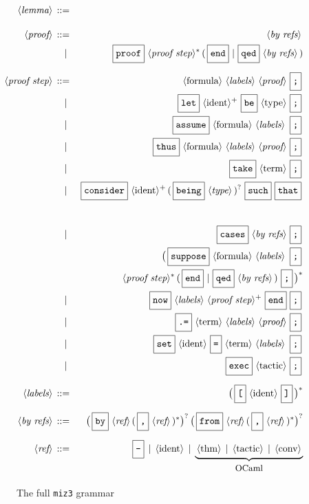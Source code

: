 \documentclass{LMCS}
\def\xtoolong{\hspace{-100cm}}
\def\notion#1{\,\langle\mbox{\it #1}\rangle\,}
\def\terminal#1{\,\langle\mbox{\rm #1}\rangle\,}
\def\key#1{\,\fbox{\strut\tt #1}\,}
\def\literal#1{\,\fbox{\strut\tt #1}\,}
\def\alter{\phantom{::=}\llap{$|$}}
\begin{document}
\begin{figure}
\vspace{2em}
\begin{eqnarray*}
\xtoolong\notion{lemma} &::=& \overbrace{\big(\key{let}\terminal{ident}\literal{=}\big)\!\strut^?\,\key{thm}\literal{`;}
\overbrace{\terminal{formula}\notion{proof}\literal{;}^?}^{\mbox{\small \texttt{miz3\vrule height 8.5pt depth 2pt width 0pt}}}
\literal{`}\literal{;;}}^{\mbox{\small HOL Light}}\xtoolong \\
\noalign{\medskip}
\notion{proof} &::=& \notion{by refs} \\
&\alter&
\key{proof}\notion{proof step}\!^*\,(\key{end}\,|\,\key{qed}\notion{by refs}) \\
\noalign{\medskip}
\xtoolong\notion{proof step} &::=& \terminal{formula}\notion{labels}\notion{proof}\literal{;} \\
&\alter& \key{let}\terminal{ident}\!^+\,\key{be}\terminal{type}\literal{;} \\
&\alter& \key{assume}\terminal{formula}\notion{labels}\,\literal{;} \\
&\alter& \key{thus}\terminal{formula}\notion{labels}\notion{proof}\literal{;} \\
&\alter& \key{take}\terminal{term}\literal{;} \\
&\alter& \key{consider}\terminal{ident}\!^+\,(\key{being}\notion{type})^?\,\key{such}\key{that} \\
&& \quad \terminal{formula}\notion{labels}
\notion{proof}\literal{;}\xtoolong \\
&\alter& \key{cases}\notion{by refs}\literal{;} \\
&& \big(\key{suppose}\terminal{formula}\notion{labels}\,\literal{;} \\
&& \quad \notion{proof step}\!^*\, (\key{end}\,|\,\key{qed}\notion{by refs})\,\literal{;}\big)^* \\
&\alter& \key{now}\notion{labels}\notion{proof step}\!^+\,\key{end}\literal{;} \\
&\alter& \literal{.=}\terminal{term}\notion{labels}\notion{proof}\literal{;} \\
&\alter& \key{set}\terminal{ident}\literal{=}\terminal{term}\notion{labels}\,\literal{;} \\
&\alter& \key{exec}\terminal{tactic}\literal{;} \\
\noalign{\medskip}
\notion{labels} &::=& \big(\literal{[}\terminal{ident}\literal{]}\big)^* \\
\noalign{\medskip}
\xtoolong\notion{by refs} &::=& \big(\key{by}\notion{ref}(\literal{,}\notion{ref})^*\big)^?\,\big(\key{from}\notion{ref}(\literal{,}\notion{ref})^*\big)^? \\
\noalign{\medskip}
\notion{ref} &::=& \literal{-} \;|\; \terminal{ident}\;|\; \underbrace{\strut\terminal{{thm}}\;|\; \terminal{{tactic}}\;|\; \terminal{{conv}}}_{\mbox{\small\strut OCaml}} \\
\end{eqnarray*}
\caption{The full \texttt{miz3} grammar}
\label{grammar}
\vspace{2em}
\end{figure}
\end{document}
